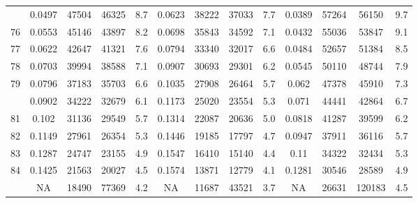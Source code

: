 \documentclass[
  14pt,
]{article}
\begin{document}
\begin{longtable}[t]{lcccccccccccc}
\addlinespace
75 & 0.0497 & 47504 & 46325 & 8.7 & 0.0623 & 38222 & 37033 & 7.7 & 0.0389 & 57264 & 56150 & 9.7\\
76 & 0.0553 & 45146 & 43897 & 8.2 & 0.0698 & 35843 & 34592 & 7.1 & 0.0432 & 55036 & 53847 & 9.1\\
77 & 0.0622 & 42647 & 41321 & 7.6 & 0.0794 & 33340 & 32017 & 6.6 & 0.0484 & 52657 & 51384 & 8.5\\
78 & 0.0703 & 39994 & 38588 & 7.1 & 0.0907 & 30693 & 29301 & 6.2 & 0.0545 & 50110 & 48744 & 7.9\\
79 & 0.0796 & 37183 & 35703 & 6.6 & 0.1035 & 27908 & 26464 & 5.7 & 0.062 & 47378 & 45910 & 7.3\\
\addlinespace
80 & 0.0902 & 34222 & 32679 & 6.1 & 0.1173 & 25020 & 23554 & 5.3 & 0.071 & 44441 & 42864 & 6.7\\
81 & 0.102 & 31136 & 29549 & 5.7 & 0.1314 & 22087 & 20636 & 5.0 & 0.0818 & 41287 & 39599 & 6.2\\
82 & 0.1149 & 27961 & 26354 & 5.3 & 0.1446 & 19185 & 17797 & 4.7 & 0.0947 & 37911 & 36116 & 5.7\\
83 & 0.1287 & 24747 & 23155 & 4.9 & 0.1547 & 16410 & 15140 & 4.4 & 0.11 & 34322 & 32434 & 5.3\\
84 & 0.1425 & 21563 & 20027 & 4.5 & 0.1574 & 13871 & 12779 & 4.1 & 0.1281 & 30546 & 28589 & 4.9\\
\addlinespace
85 & NA & 18490 & 77369 & 4.2 & NA & 11687 & 43521 & 3.7 & NA & 26631 & 120183 & 4.5\\*
\end{longtable}
\end{document}

